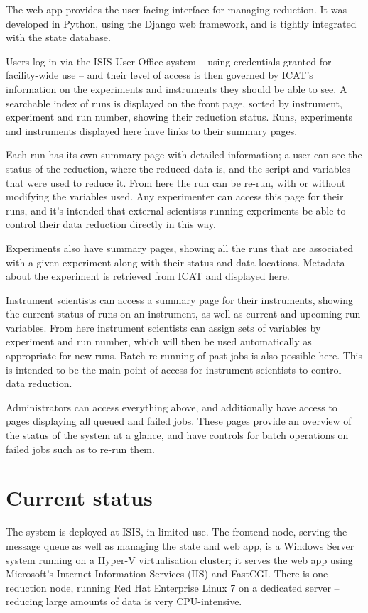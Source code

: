 \documentclass[twocolumn]{article}
\begin{document}
The web app provides the user-facing interface for managing reduction.
It was developed in Python, using the Django web framework, and is
tightly integrated with the state database.

Users log in via the ISIS User Office system -- using credentials 
granted for facility-wide use -- and their level of access is then 
governed by ICAT's information on the experiments and instruments they 
should be able to see. A searchable index of runs is displayed on the front page, sorted
by instrument, experiment and run number, showing their reduction
status. Runs, experiments and instruments displayed here have links to
their summary pages.

Each run has its own summary page with detailed information; a user can
see the status of the reduction, where the reduced data is, and the
script and variables that were used to reduce it. From here the run can
be re-run, with or without modifying the variables used. Any
experimenter can access this page for their runs, and it's intended that
external scientists running experiments be able to control their data
reduction directly in this way.

Experiments also have summary pages, showing all the runs that are
associated with a given experiment along with their status and data
locations. Metadata about the experiment is retrieved from ICAT and
displayed here.

Instrument scientists can access a summary page for their instruments,
showing the current status of runs on an instrument, as well as current
and upcoming run variables. From here instrument scientists can assign
sets of variables by experiment and run number, which will then be used
automatically as appropriate for new runs. Batch re-running of past jobs
is also possible here. This is intended to be the main point of access
for instrument scientists to control data reduction.

Administrators can access everything above, and additionally have access
to pages displaying all queued and failed jobs. These pages provide an
overview of the status of the system at a glance, and have controls for
batch operations on failed jobs such as to re-run them.

\section{Current status}\label{current-status}

The system is deployed at ISIS, in limited use. The frontend node,
serving the message queue as well as managing the state and web app, is
a Windows Server system running on a Hyper-V\cite{hyper-v} virtualisation
cluster; it serves the web app using Microsoft's Internet Information
Services (IIS)\cite{iis} and FastCGI\cite{fcgi}. There is one reduction node, 
running Red Hat Enterprise Linux 7\cite{rhel} on a dedicated server -- 
reducing large amounts of data is very CPU-intensive.
\end{document}
